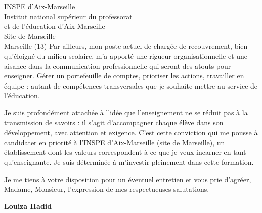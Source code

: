 \documentclass[12pt,a4paper]{letter}
\begin{document}
\begin{letter}{INSPE d'Aix-Marseille\\
Institut national supérieur du professorat\\
et de l'éducation d'Aix-Marseille\\
Site de Marseille\\
Marseille (13)}
\hspace{1cm} Par ailleurs, mon poste actuel de chargée de recouvrement, bien qu'éloigné du milieu scolaire, m'a apporté une rigueur organisationnelle et une aisance dans la communication professionnelle qui seront des atouts pour enseigner. Gérer un portefeuille de comptes, prioriser les actions, travailler en équipe : autant de compétences transversales que je souhaite mettre au service de l'éducation.

\hspace{1cm} Je suis profondément attachée à l'idée que l'enseignement ne se réduit pas à la transmission de savoirs : il s'agit d'accompagner chaque élève dans son développement, avec attention et exigence. C'est cette conviction qui me pousse à candidater en priorité à l'INSPE d'Aix-Marseille (site de Marseille), un établissement dont les valeurs correspondent à ce que je veux incarner en tant qu'enseignante. Je suis déterminée à m'investir pleinement dans cette formation.

\closing{Je me tiens à votre disposition pour un éventuel entretien et vous prie d'agréer, Madame, Monsieur, l'expression de mes respectueuses salutations.}

\vspace{0.5cm}
\hfill \textbf{Louiza Hadid}

\end{letter}
\end{document}
